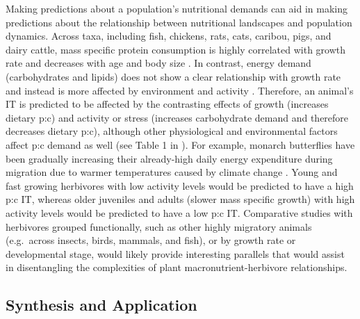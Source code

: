 \documentclass[
]{article}
\begin{document}
Making predictions about a population's nutritional demands can aid in
making predictions about the relationship between nutritional landscapes
and population dynamics. Across taxa, including fish, chickens, rats,
cats, caribou, pigs, and dairy cattle, mass specific protein consumption
is highly correlated with growth rate and decreases with age and body
size \citep{talal_body_2024}. In contrast, energy demand (carbohydrates
and lipids) does not show a clear relationship with growth rate and
instead is more affected by environment and activity
\citep{talal_body_2024}. Therefore, an animal's IT is predicted to be
affected by the contrasting effects of growth (increases dietary p:c)
and activity or stress (increases carbohydrate demand and therefore
decreases dietary p:c), although other physiological and environmental
factors affect p:c demand as well (see Table 1 in
\citet{cease_how_2024}). For example, monarch butterflies have been
gradually increasing their already-high daily energy expenditure during
migration due to warmer temperatures caused by climate change
\citep{parlin_cost_2023}. Young and fast growing herbivores with low
activity levels would be predicted to have a high p:c IT, whereas older
juveniles and adults (slower mass specific growth) with high activity
levels would be predicted to have a low p:c IT. Comparative studies with
herbivores grouped functionally, such as other highly migratory animals
(e.g.~across insects, birds, mammals, and fish), or by growth rate or
developmental stage, would likely provide interesting parallels that
would assist in disentangling the complexities of plant
macronutrient-herbivore relationships.

\subsection{Synthesis and Application}\label{synthesis-and-application}
\end{document}
